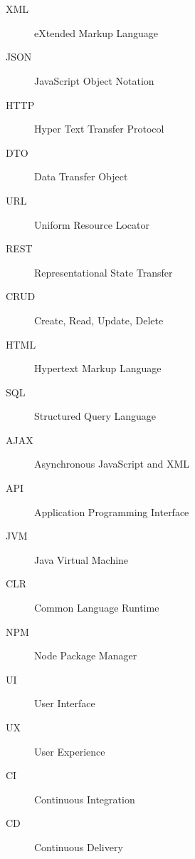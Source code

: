 \chapter*{\SeznamZkratek}

\begin{multicols}{2}
\raggedright
\begin{description}
\item [XML] eXtended Markup Language
\item [JSON] JavaScript Object Notation
\item [HTTP] Hyper Text Transfer Protocol
\item [DTO] Data Transfer Object
\item [URL] Uniform Resource Locator
\item [REST] Representational State Transfer
\item [CRUD] Create, Read, Update, Delete
\item [HTML] Hypertext Markup Language
\item [SQL] Structured Query Language
\item [AJAX] Asynchronous JavaScript and XML
\item [API] Application Programming Interface
\item [JVM] Java Virtual Machine
\item [CLR] Common Language Runtime
\item [NPM] Node Package Manager
\item [UI] User Interface
\item [UX] User Experience
\item [CI] Continuous Integration
\item [CD] Continuous Delivery
\end{description}
\end{multicols}

